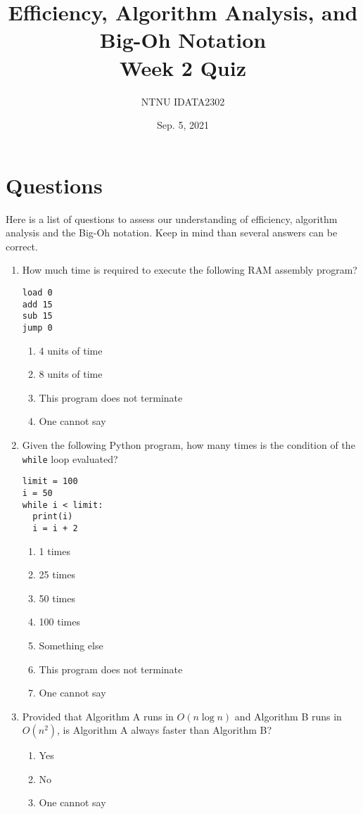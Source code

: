 \documentclass[11pt]{article}
\author{NTNU IDATA2302}
\date{Sep. 5, 2021}
\title{Efficiency, Algorithm Analysis, and Big-Oh Notation\\\medskip
\large Week 2 Quiz}
\begin{document}
\maketitle


\section{Questions}
\label{sec:org648967b}

Here is a list of questions to assess our understanding of efficiency,
algorithm analysis and the Big-Oh notation. Keep in mind than several
answers can be correct.

\begin{enumerate}
\item How much time is required to execute the following RAM assembly
program?
\begin{verbatim}
load 0
add 15
sub 15
jump 0
\end{verbatim}

\begin{enumerate}
\item 4 units of time
\item 8 units of time
\item This program does not terminate
\item One cannot say
\end{enumerate}

\item Given the following Python program, how many times is the condition of the
\texttt{while} loop evaluated?
\begin{verbatim}
limit = 100
i = 50
while i < limit:
  print(i)
  i = i + 2
\end{verbatim}

\begin{enumerate}
\item 1 times
\item 25 times
\item 50 times
\item 100 times
\item Something else
\item This program does not terminate
\item One cannot say
\end{enumerate}

\item Provided that Algorithm A runs in \(O(n \log n)\) and Algorithm B runs in
\(O(n^2)\), is Algorithm A always faster than Algorithm B?
\begin{enumerate}
\item Yes
\item No
\item One cannot say
\end{enumerate}


\end{enumerate}
\end{document}
